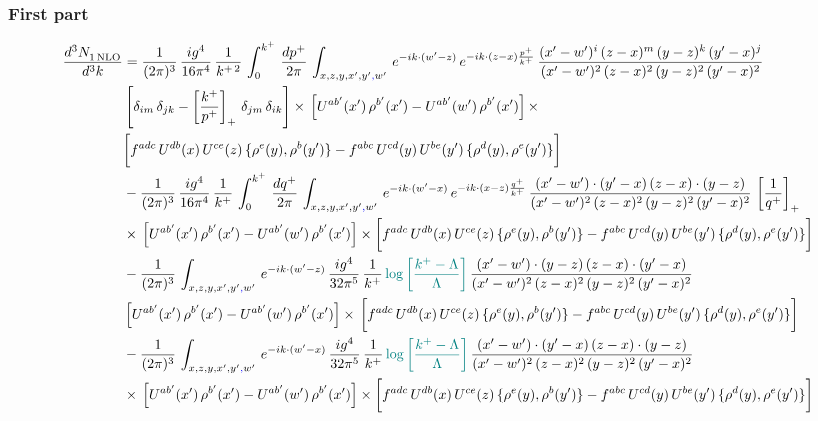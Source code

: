 \documentclass[9pt]{article}
\numberwithin{equation}{section}
\begin{document}
\subsubsection*{First part}
\begin{align}
     \frac{d^{3}N_{1\,\rm NLO}^{\rm}}{d^{3}k}  & = \frac{1}{(2\pi)^{3}}\, \frac{ig^{4}}{16\pi^{4}}\, \frac{1}{k^{+\,2}}\,\int_{0}^{k^{+}}\, \frac{dp^{+}}{2\pi}\,\int_{x,z,y,x',y'{\color{blue},}w'}\,e^{-ik\cdot (w^\prime-z)}\,e^{-ik\cdot (z-x)\frac{p^{+}}{k^{+}}}\,\frac{(x'-w')^{i}\,(z-x)^{m}\,(y-z)^{k}\,(y'-x)^{j}}{(x'-w')^{2}\,(z-x)^{2}\,(y-z)^{2}\,(y'-x)^{2}}\,\notag \\ & \left[\delta_{im}\,\delta_{jk}-\left[\frac{k^{+}}{p^{+}}\right]_{+}\, \delta_{jm}\,\delta_{ik}\right]\times\, \left[U^{ab'}(x')\,\rho^{b'}(x')-U^{ab'}(w')\,\rho^{b'}(x')\right]\times\notag \\ & \bigg[f^{adc}\,U^{db}(x)\,U^{ce}(z)\, \{\rho^{e}(y),\rho^{b}(y')\}-f^{abc}\,U^{cd}(y)\,U^{be}(y')\, \{\rho^{d}(y),\rho^{e}(y')\}\bigg]\notag \\ & -\frac{1}{(2\pi)^{3}}\, \frac{ig^{4}}{16\pi^{4}}\, \frac{1}{k^{+}}\,\int_{0}^{k^{+}}\, \frac{dq^{+}}{2\pi}\,\int_{x,z,y,x',y'{\color{blue},}w'}\,e^{-ik\cdot (w^\prime-x)}\,e^{-ik\cdot (x-z)\frac{q^{+}}{k^{+}}}\,\frac{(x'-w')\cdot (y'-x)\,(z-x)\cdot (y-z)}{(x'-w')^{2}\,(z-x)^{2}\,(y-z)^{2}\,(y'-x)^{2}}\,\left[\frac{1}{q^{+}}\right]_{+}\notag \\ & \times\, \left[U^{ab'}(x')\,\rho^{b'}(x')-U^{ab'}(w')\,\rho^{b'}(x')\right]\times \bigg[f^{adc}\,U^{db}(x)\,U^{ce}(z)\, \{\rho^{e}(y),\rho^{b}(y')\}-f^{abc}\,U^{cd}(y)\,U^{be}(y')\, \{\rho^{d}(y),\rho^{e}(y')\}\bigg]\notag \\ & -\frac{1}{(2\pi)^{3}}\, \int_{x,z,y,x',y'{\color{blue},}w'}\,e^{-ik\cdot (w^\prime-z)}\,\frac{ig^{4}}{32\pi^{5}}\, \frac{1}{k^{+}}\,{\color{teal}\log{\left[\frac{k^{+}-\Lambda}{\Lambda}\right]}}\,\frac{(x'-w')\cdot (y-z)\,(z-x)\cdot (y'-x)}{(x'-w')^{2}\,(z-x)^{2}\,(y-z)^{2}\,(y'-x)^{2}}\,\notag \\ & \left[U^{ab'}(x')\,\rho^{b'}(x')-U^{ab'}(w')\,\rho^{b'}(x')\right]\times\, \bigg[f^{adc}\,U^{db}(x)\,U^{ce}(z)\, \{\rho^{e}(y),\rho^{b}(y')\}-f^{abc}\,U^{cd}(y)\,U^{be}(y')\, \{\rho^{d}(y),\rho^{e}(y')\}\bigg]\notag \\ &  -\frac{1}{(2\pi)^{3}}\, \int_{x,z,y,x',y'{\color{blue},}w'}\,e^{-ik\cdot (w^\prime-x)}\,\frac{ig^{4}}{32\pi^{5}}\, \frac{1}{k^{+}}\,{\color{teal}\log{\left[\frac{k^{+}-\Lambda}{\Lambda}\right]}}\,\frac{(x'-w')\cdot (y'-x)\,(z-x)\cdot (y-z)}{(x'-w')^{2}\,(z-x)^{2}\,(y-z)^{2}\,(y'-x)^{2}}\notag \\ & \times\, \left[U^{ab'}(x')\,\rho^{b'}(x')-U^{ab'}(w')\,\rho^{b'}(x')\right]\times \bigg[f^{adc}\,U^{db}(x)\,U^{ce}(z)\, \{\rho^{e}(y),\rho^{b}(y')\}-f^{abc}\,U^{cd}(y)\,U^{be}(y')\, \{\rho^{d}(y),\rho^{e}(y')\}\bigg]
\end{align}
\end{document}
